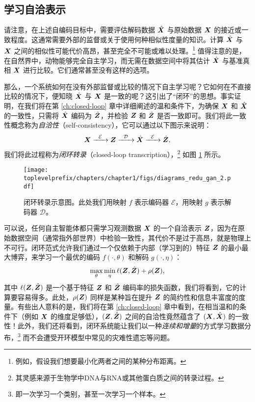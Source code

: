 \documentclass[../../book-main_zh.tex]{subfiles}
\begin{document}
\subsection{学习自洽表示}
请注意，在上述自编码目标中，需要评估解码数据 $\hat {\bm{X}}$ 与原始数据 $\bm{X}$ 的接近或一致程度。这通常需要外部的监督或关于使用何种相似性度量的知识。计算 $\hat {\bm{X}}$ 与 $\bm{X}$ 之间的相似性可能代价高昂，甚至完全不可能或难以处理。\footnote{例如，假设我们想要最小化两者之间的某种分布距离。} 值得注意的是，在自然界中，动物能够完全自主学习，而无需在数据空间中将其估计 $\hat {\bm{X}}$ 与基准真相 $\bm{X}$ 进行比较。它们通常甚至没有这样的选项。

那么，一个系统如何在没有外部监督或比较的情况下自主学习呢？它如何在不直接比较的情况下，便知晓 $\hat {\bm{X}}$ 与 $\bm{X}$ 是一致的呢？这引出了“闭环”的思想。事实证明，在我们将在第 \ref{ch:closed-loop} 章中详细阐述的温和条件下，为确保 $\bm{X}$ 和 $\hat {\bm{X}}$ 的一致性，只需将 $\hat {\bm{X}}$ 编码为 $\hat {\bm{Z}}$，并检验 $\bm{Z}$ 和 $\hat {\bm{Z}}$ 是否一致即可。我们将此一致性概念称为{\em 自洽性}（self-consistency），它可以通过以下图示来说明：
\begin{equation}
    \bm{X}   \xrightarrow{\hspace{2mm} \mathcal{E}\hspace{2mm}} \bm{Z}  \xrightarrow{\hspace{2mm} \mathcal{D} \hspace{2mm}} \hat {\bm{X}} \xrightarrow{\hspace{2mm} \mathcal{E}\hspace{2mm}} \hat {\bm{Z}},
    \label{eqn:closed-loop}
\end{equation}
我们将此过程称为{\em 闭环转录}（closed-loop transcription），\footnote{其灵感来源于生物学中DNA与RNA或其他蛋白质之间的转录过程。} 如图 \ref{fig:closed-loop} 所示。

\begin{figure}[t]
    \centering
\texttt{[image: \\toplevelprefix/chapters/chapter1/figs/diagrams\_redu\_gan\_2.pdf]}
\caption{闭环转录示意图。此处我们用映射 $f$ 表示编码器 $\mathcal{E}$，用映射 $g$ 表示解码器 $\mathcal{D}$。}  \label{fig:closed-loop}
\end{figure}

可以说，任何自主智能体都只需学习观测数据 $\bm{X}$ 的一个自洽表示 $\bm{Z}$，因为在原始数据空间（通常指外部世界）中检验一致性，其代价不是过于高昂，就是物理上不可行。闭环范式允许我们通过一个仅依赖于内部（学习到的）特征 $\bm{Z}$ 的最小最大博弈，来学习一个最优的编码 $f(\cdot, \theta)$ 和解码 $g(\cdot, \eta)$：
\begin{equation}
\max_{\theta}\min_{\eta} \ell( \bm{Z}, \hat {\bm{Z}}) + \rho(\bm{Z}), 
   \label{eqn:closed-loop-objective}
\end{equation}
其中 $\ell( \bm{Z}, \hat {\bm{Z}})$ 是一个基于特征 $\bm{Z}$ 和 $\hat {\bm{Z}}$ 编码率的损失函数，我们将看到，它的计算要容易得多。此处，$\rho(\bm{Z})$ 同样是某种旨在提升 $\bm{Z}$ 的简约性和信息丰富度的度量。有些出人意料的是，我们将在第 \ref{ch:closed-loop} 章中看到，在相当温和的条件下（例如 $\bm{X}$ 的维度足够低），$(\bm{Z}, \hat {\bm{Z}})$ 之间的自洽性竟然蕴含了 $(\bm{X}, \hat {\bm{X}})$ 的一致性！此外，我们还将看到，闭环系统能让我们以一种{\em 连续和增量}的方式学习数据分布，\footnote{即一次学习一个类别，甚至一次学习一个样本。} 而不会遭受开环模型中常见的灾难性遗忘等问题。
\end{document}
